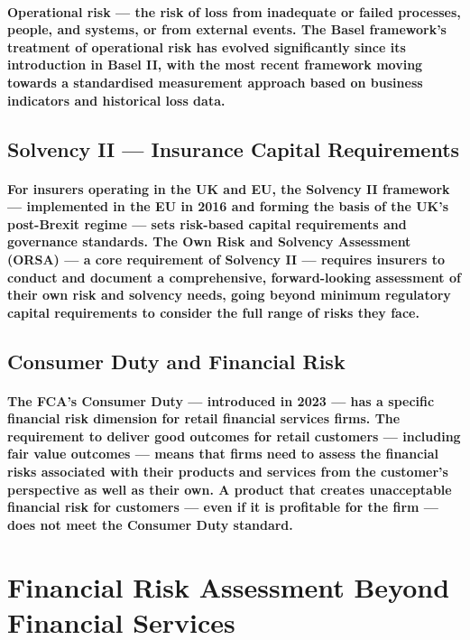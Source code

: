 \paragraph{\textbf{Operational risk} — the risk of loss from inadequate or failed processes, people, and systems, or from external events. The Basel framework's treatment of operational risk has evolved significantly since its introduction in Basel II, with the most recent framework moving towards a standardised measurement approach based on business indicators and historical loss data.}

\subsection{Solvency II — Insurance Capital Requirements}
\paragraph{For insurers operating in the UK and EU, the Solvency II framework — implemented in the EU in 2016 and forming the basis of the UK's post-Brexit regime — sets risk-based capital requirements and governance standards. The Own Risk and Solvency Assessment (ORSA) — a core requirement of Solvency II — requires insurers to conduct and document a comprehensive, forward-looking assessment of their own risk and solvency needs, going beyond minimum regulatory capital requirements to consider the full range of risks they face.}

\subsection{Consumer Duty and Financial Risk}
\paragraph{The \textbf{FCA's Consumer Duty} — introduced in 2023 — has a specific financial risk dimension for retail financial services firms. The requirement to deliver good outcomes for retail customers — including fair value outcomes — means that firms need to assess the financial risks associated with their products and services from the customer's perspective as well as their own. A product that creates unacceptable financial risk for customers — even if it is profitable for the firm — does not meet the Consumer Duty standard.}

\section{Financial Risk Assessment Beyond Financial Services}
